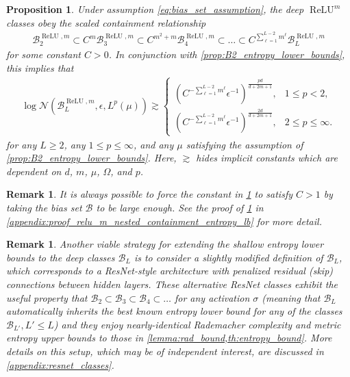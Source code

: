 \documentclass{article}
\DeclareMathOperator{\ReLU}{\mathrm{ReLU}}
\def\cB{{\mathcal{B}}}
\def\cN{{\mathcal{N}}}
\newtheorem{proposition}[theorem]{Proposition}
\newtheorem{remark}[theorem]{Remark}
\begin{document}
\begin{proposition} \label{prop:relu_m_nested_containment_entropy_lb}
Under assumption \eqref{eq:bias_set_assumption}, the deep $\ReLU^m$ classes obey the scaled containment relationship
\begin{align} \label{eq:relu_m_nested_containment}
    \cB_2^{\ReLU,m} \subset C^m \cB_3^{\ReLU,m} \subset C^{m^2+m} \cB_4^{\ReLU,m} \subset \dots \subset C^{\sum_{\ell=1}^{L-2} m^\ell} \cB_L^{\ReLU,m}
\end{align}
for some constant $C > 0$. In conjunction with \cref{prop:B2_entropy_lower_bounds}, this implies that
\begin{align}
    \log \cN(\cB_L^{\ReLU,m}, \epsilon, L^p(\mu))
    \gtrsim
    \begin{cases}
        \displaystyle
        \left(
            C^{-\sum_{\ell=1}^{L-2}m^\ell}\epsilon^{-1}
        \right)^{\frac{pd}{d+2m+1}},
        & 1 \leq p < 2,
        \\[8pt]
        \displaystyle
        \left(
            C^{-\sum_{\ell=1}^{L-2}m^\ell}\epsilon^{-1}
        \right)^{\frac{2d}{d+2m+1}},
        & 2 \leq p \leq \infty.
    \end{cases}
\end{align}
for any $L \geq 2$, any $1 \leq p \leq \infty$, and any $\mu$ satisfying the assumption of \cref{prop:B2_entropy_lower_bounds}. Here, $\gtrsim$ hides implicit constants which are dependent on $d$, $m$, $\mu$, $\Omega$, and $p$.
\end{proposition}
\begin{remark}
    It is always possible to force the constant in \cref{prop:relu_m_nested_containment_entropy_lb} to satisfy $C > 1$ by taking the bias set $\cB$ to be large enough. See the proof of \cref{prop:relu_m_nested_containment_entropy_lb} in \cref{appendix:proof_relu_m_nested_containment_entropy_lb} for more detail.
\end{remark}
\begin{remark}
    Another viable strategy for extending the shallow entropy lower bounds to the deep classes $\cB_L$ is to consider a slightly modified definition of $\cB_L$, which corresponds to a ResNet-style architecture with penalized residual (skip) connections between hidden layers. These alternative ResNet classes exhibit the useful property that $\cB_2 \subset \cB_3 \subset \cB_4 \subset \dots$ for any activation $\sigma$ (meaning that $\cB_L$ automatically inherits the best known entropy lower bound for any of the classes $\cB_{L'}, L' \leq L$) and they enjoy nearly-identical Rademacher complexity and metric entropy upper bounds to those in \cref{lemma:rad_bound,th:entropy_bound}. More details on this setup, which may be of independent interest, are discussed in \cref{appendix:resnet_classes}.
\end{remark}
\end{document}
